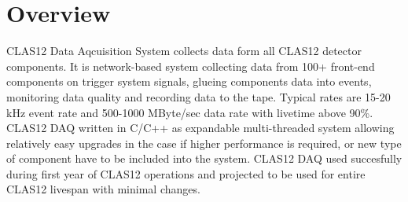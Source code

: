 \section{Overview}

CLAS12 Data Aqcuisition System collects data form all CLAS12 detector components. It is network-based system collecting data from 100+ front-end components on trigger system signals, glueing components data into events, monitoring data quality and recording data to the tape. Typical rates are 15-20 kHz event rate and 500-1000 MByte/sec data rate with livetime above 90\%. CLAS12 DAQ written in C/C++ as expandable multi-threaded system allowing relatively easy upgrades in the case if higher performance is required, or new type of component have to be included into the system. CLAS12 DAQ used succesfully
during first year of CLAS12 operations and projected to be used for entire CLAS12 livespan with minimal changes.


